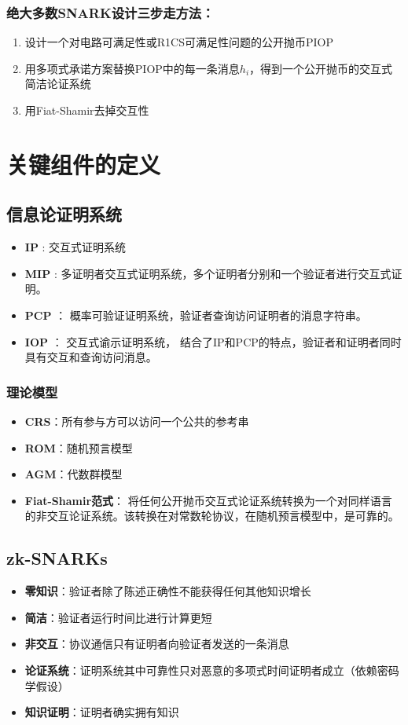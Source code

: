 \documentclass[runningheads]{llncs}
\begin{document}
\subsubsection*{绝大多数SNARK设计三步走方法：}
\begin{enumerate}
  \item 设计一个对电路可满足性或R1CS可满足性问题的公开抛币PIOP
  \item 用多项式承诺方案替换PIOP中的每一条消息$h_i$，得到一个公开抛币的交互式简洁论证系统
  \item 用Fiat-Shamir去掉交互性
\end{enumerate}

\section{关键组件的定义}
\subsection*{信息论证明系统}
\begin{itemize}
  \item \textbf{IP} : 交互式证明系统
  \item \textbf{MIP} \cite{BGK88} : 多证明者交互式证明系统，多个证明者分别和一个验证者进行交互式证明。
  \item \textbf{PCP} \cite{AS98}： 概率可验证证明系统，验证者查询访问证明者的消息字符串。
  \item \textbf{IOP} \cite{BCS16}： 交互式谕示证明系统， 结合了IP和PCP的特点，验证者和证明者同时具有交互和查询访问消息。
\end{itemize}

\subsubsection*{理论模型}
\begin{itemize}
  \item \textbf{CRS}：所有参与方可以访问一个公共的参考串
  \item \textbf{ROM}：随机预言模型 
  \item \textbf{AGM}：代数群模型
  \item \textbf{Fiat-Shamir范式}： 将任何公开抛币交互式论证系统转换为一个对同样语言的非交互论证系统。该转换在对常数轮协议，在随机预言模型中，是可靠的。\cite{BR93}

\end{itemize}

\subsection*{zk-SNARKs}
\begin{itemize}
  \item \textbf{零知识}：验证者除了陈述正确性不能获得任何其他知识增长
  \item \textbf{简洁}：验证者运行时间比进行计算更短
  \item \textbf{非交互}：协议通信只有证明者向验证者发送的一条消息
  \item \textbf{论证系统}：证明系统其中可靠性只对恶意的多项式时间证明者成立（依赖密码学假设）
  \item \textbf{知识证明}：证明者确实拥有知识
\end{itemize}
\end{document}
